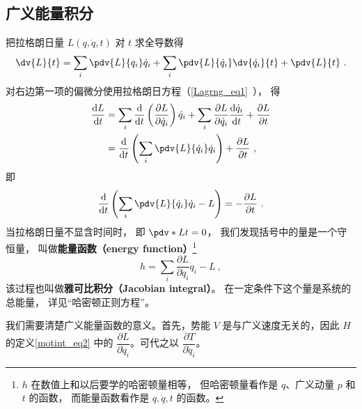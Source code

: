 \subsection{广义能量积分}

把拉格朗日量 $L(q, \dot{q}, t)$ 对 $t$ 求全导数得
\begin{equation}
\dv{L}{t} = \sum_{i} \pdv{L}{q_i} \dot{q}_i + \sum_{i} \pdv{L}{\dot{q}_i} \dv{\dot{q}_i}{t} + \pdv{L}{t}~.
\end{equation}
对右边第一项的偏微分使用拉格朗日方程（\autoref{Lagrng_eq1}~）， 得
\begin{equation}
\begin{aligned}
\frac{\mathrm{d} L}{\mathrm{d} t} &=\sum_{i} \frac{\mathrm{d}}{\mathrm{d} t}\left(\frac{\partial L}{\partial \dot{q}_{i}}\right) \dot{q}_{i}+\sum_{i} \frac{\partial L}{\partial \dot{q}_{i}} \frac{\mathrm{d} \dot{q}_{i}}{\mathrm{d} t} + \frac{\partial L}{\partial t} \\
&= \frac{\mathrm{d}}{\mathrm{d} t}\left(\sum_{i} \pdv{L}{\dot q_i} \dot{q}_{i}\right) + \frac{\partial L}{\partial t}~,
\end{aligned}
\end{equation}
即
\begin{equation} \label{motint_eq1}
\frac{\mathrm{d}}{\mathrm{d} t}\left(\sum_{i} \pdv{L}{\dot q_i} \dot{q}_{i}-L\right) = -\frac{\partial L}{\partial t}~.
\end{equation}
当拉格朗日量不显含时间时， 即 $\pdv*{L}{t} = 0$， 我们发现括号中的量是一个守恒量， 叫做\textbf{能量函数（energy function）}\footnote{$h$ 在数值上和以后要学的哈密顿量相等， 但哈密顿量看作是 $q$、广义动量 $p$ 和 $t$ 的函数， 而能量函数看作是 $q, \dot q, t$ 的函数。}
\begin{equation} \label{motint_eq2}
h = \sum_{i} \frac{\partial L}{\partial \dot{q}_{i}} \dot{q}_{i}-L~,
\end{equation}
该过程也叫做\textbf{雅可比积分（Jacobian integral）}。 在一定条件下这个量是系统的总能量， 详见“哈密顿正则方程”。


我们需要清楚广义能量函数的意义。首先，势能 $V$ 是与广义速度无关的，因此 $H$ 的定义\autoref{motint_eq2} 中的 $\dfrac{\partial L}{\partial \dot q_i}$。可代之以 $\dfrac{\partial T}{\partial \dot q_i}$。


